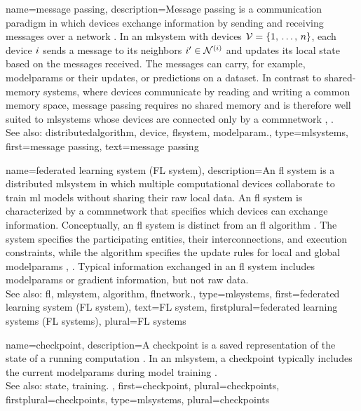 {name={message passing},
	description={Message passing is a communication paradigm
		in which \glspl{device} exchange information by sending and receiving
		messages over a network \cite{LynchDistributedAlgorithms}.
		In an \gls{mlsystem} with \glspl{device} $\mathcal{V} = \{1,\,\ldots,\,n\}$,
		each \gls{device} $i$ sends a message to its \glspl{neighbor}
		$i' \in \mathcal{N}^{(i)}$ and updates its local \gls{state}
		based on the messages received. The messages can carry, for example,
		\glspl{modelparam} or their updates, or \glspl{prediction} on a \gls{dataset}.
		In contrast to shared-memory systems, where \glspl{device} communicate by
		reading and writing a common memory space, message passing requires no
		shared memory and is therefore well suited to \glspl{mlsystem} whose
		\glspl{device} are connected only by a \gls{commnetwork} \cite{LynchDistributedAlgorithms}, \cite{DistributedSystems}.
		\\
		See also: \gls{distributedalgorithm}, \gls{device}, \gls{flsystem}, \gls{modelparam}.},
	type=mlsystems,
	first={message passing},
	text={message passing}
}

{name={federated learning system (FL system)},
	description={An \gls{fl} system is a 
		distributed \gls{mlsystem} in which multiple computational \glspl{device} 
		collaborate to train \gls{ml} \glspl{model} without sharing their raw local \gls{data}.
		An \gls{fl} system is characterized by a \gls{commnetwork} that specifies 
		which \glspl{device} can exchange information. Conceptually, an \gls{fl} system is 
		distinct from an \gls{fl} \gls{algorithm} \cite{DistributedSystems}. The system 
		specifies the participating entities, their interconnections, and execution constraints, while the \gls{algorithm} 
		specifies the update rules for local and global \glspl{modelparam} \cite{LynchDistributedAlgorithms}, \cite{KnuthAlgoBook}.
		Typical information exchanged in an \gls{fl} system includes 
		\glspl{modelparam} or \gls{gradient} information, but not raw \gls{data}.
		\\
		See also: \gls{fl}, \gls{mlsystem}, \gls{algorithm}, \gls{flnetwork}.},
 	type=mlsystems,
 	first={federated learning system (FL system)},
 	text={FL system},
 	firstplural={federated learning systems (FL systems)},
 	plural={FL systems}
}

{name={checkpoint},
	description={A checkpoint is a saved representation 
   		of the \gls{state} of a running computation \cite{Elnozahy2002}.
 		In an \gls{mlsystem}, a checkpoint typically includes the current \glspl{modelparam} 
		during \gls{model} \gls{training} \cite{Abadi2016}.
		\\
		See also: \gls{state}, \gls{training}. },
	first={checkpoint},
	plural={checkpoints},
	firstplural={checkpoints},
	type=mlsystems,
	plural={checkpoints}
}

